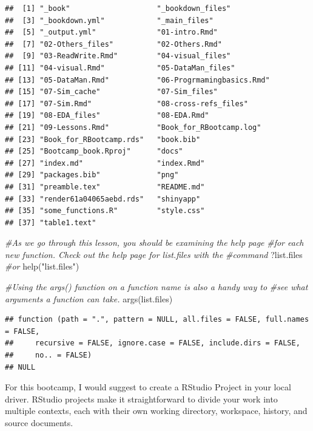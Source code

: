 \documentclass[
]{book}
\newenvironment{Shaded}{\begin{snugshade}}{\end{snugshade}}
\newcommand{\CommentTok}[1]{\textcolor[rgb]{0.56,0.35,0.01}{\textit{#1}}}
\newcommand{\FunctionTok}[1]{\textcolor[rgb]{0.00,0.00,0.00}{#1}}
\newcommand{\NormalTok}[1]{#1}
\newcommand{\StringTok}[1]{\textcolor[rgb]{0.31,0.60,0.02}{#1}}
\begin{document}
\begin{verbatim}
##  [1] "_book"                    "_bookdown_files"         
##  [3] "_bookdown.yml"            "_main_files"             
##  [5] "_output.yml"              "01-intro.Rmd"            
##  [7] "02-Others_files"          "02-Others.Rmd"           
##  [9] "03-ReadWrite.Rmd"         "04-visual_files"         
## [11] "04-visual.Rmd"            "05-DataMan_files"        
## [13] "05-DataMan.Rmd"           "06-Progrmamingbasics.Rmd"
## [15] "07-Sim_cache"             "07-Sim_files"            
## [17] "07-Sim.Rmd"               "08-cross-refs_files"     
## [19] "08-EDA_files"             "08-EDA.Rmd"              
## [21] "09-Lessons.Rmd"           "Book_for_RBootcamp.log"  
## [23] "Book_for_RBootcamp.rds"   "book.bib"                
## [25] "Bootcamp_book.Rproj"      "docs"                    
## [27] "index.md"                 "index.Rmd"               
## [29] "packages.bib"             "png"                     
## [31] "preamble.tex"             "README.md"               
## [33] "render61a04065aebd.rds"   "shinyapp"                
## [35] "some_functions.R"         "style.css"               
## [37] "table1.text"
\end{verbatim}

\begin{Shaded}
\begin{Highlighting}[]
\CommentTok{\#As we go through this lesson, you should be examining the help page }
\CommentTok{\#for each new function. Check out the help page for list.files with the}
\CommentTok{\#command}
\NormalTok{?list.files}
\CommentTok{\#or}
\FunctionTok{help}\NormalTok{(}\StringTok{"list.files"}\NormalTok{)}

\CommentTok{\#Using the args() function on a function name is also a handy way to }
\CommentTok{\#see what arguments a function can take.}
\FunctionTok{args}\NormalTok{(list.files)}
\end{Highlighting}
\end{Shaded}

\begin{verbatim}
## function (path = ".", pattern = NULL, all.files = FALSE, full.names = FALSE, 
##     recursive = FALSE, ignore.case = FALSE, include.dirs = FALSE, 
##     no.. = FALSE) 
## NULL
\end{verbatim}

For this bootcamp, I would suggest to create a RStudio Project in your local driver. RStudio projects make it straightforward to divide your work into multiple contexts, each with their own working directory, workspace, history, and source documents.
\end{document}
